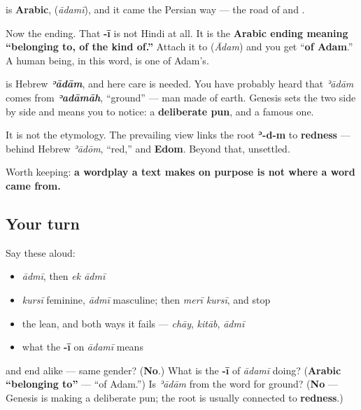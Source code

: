 \begin{cousinweb}
\textbf{} is \textbf{Arabic}, \textbf{} (\emph{ādamī}), and it came the Persian way — the road of \textbf{} and \textbf{}.

Now the ending. That \textbf{-ī} is not Hindi at all. It is the \textbf{Arabic ending meaning \textquotedblleft{}belonging to, of the kind of.\textquotedblright{}} Attach it to \textbf{} (\emph{Ādam}) and you get \textquotedblleft{}\textbf{of Adam}.\textquotedblright{} A human being, in this word, is one of Adam's.

\textbf{} is Hebrew \emph{\textbf{ʾādām}}, and here care is needed. You have probably heard that \emph{ʾādām} comes from \emph{\textbf{ʾadāmāh}}, \textquotedblleft{}ground\textquotedblright{} — man made of earth. Genesis sets the two side by side and means you to notice: a \textbf{deliberate pun}, and a famous one.

It is not the etymology. The prevailing view links the root \textbf{ʾ-d-m} to \textbf{redness} — behind Hebrew \emph{ʾādōm}, \textquotedblleft{}red,\textquotedblright{} and \textbf{Edom}. Beyond that, unsettled.

Worth keeping: \textbf{a wordplay a text makes on purpose is not where a word came from.}
\end{cousinweb}

\subsection*{Your turn}
Say these aloud:

\begin{itemize}
\raggedright
  \item \emph{ādmī}, then \emph{ek ādmī}
  \item \emph{kursī} feminine, \emph{ādmī} masculine; then \emph{merī kursī}, and stop
  \item the lean, and both ways it fails — \emph{chāy}, \emph{kitāb}, \emph{ādmī}
  \item what the \textbf{-ī} on \emph{ādamī} means
\end{itemize}

\begin{tcolorbox}[breakable,colback=teal!4,colframe=teal!35!black,title={Before you move on}]
\textbf{} and \textbf{} end alike — same gender? (\textbf{No}.) What is the \textbf{-ī} of \emph{ādamī} doing? (\textbf{Arabic \textquotedblleft{}belonging to\textquotedblright{}} — \textquotedblleft{}of Adam.\textquotedblright{}) Is \emph{ʾādām} from the word for ground? (\textbf{No} — Genesis is making a deliberate pun; the root is usually connected to \textbf{redness}.)
\end{tcolorbox}

